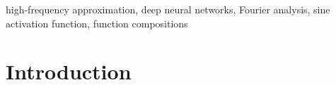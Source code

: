 \documentclass[11pt,a4paper]{article}
\begin{document}
\begin{abstract}



\end{abstract}



\begin{keywords}
        high-frequency approximation,
        deep neural networks,
        Fourier analysis,
        sine activation function,
        function compositions
\end{keywords}



\section{Introduction}
\label{sec:intro}
\end{document}
